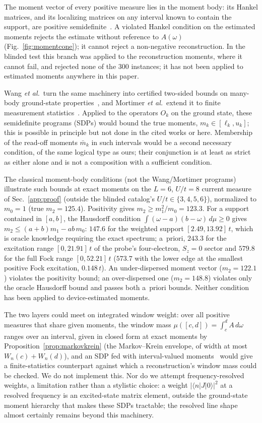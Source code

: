 \documentclass[aps,prb,onecolumn,superscriptaddress,longbibliography,floatfix]{revtex4-2}
\begin{document}
The moment vector of every positive measure lies in the moment body: its Hankel matrices, and its localizing matrices on any interval known to contain the support, are positive semidefinite~\cite{ShohatTamarkin1943,Akhiezer1965}. A violated Hankel condition on the estimated moments rejects the estimate without reference to $A(\omega)$ (Fig.~\ref{fig:momentcone}); it cannot reject a non-negative reconstruction. In the blinded test this branch was applied to the reconstruction moments, where it cannot fail, and rejected none of the $300$ instances; it has not been applied to estimated moments anywhere in this paper.

Wang \emph{et al.}\ turn the same machinery into certified two-sided bounds on many-body ground-state properties~\cite{WangAcin2024}, and Mortimer \emph{et al.}\ extend it to finite measurement statistics~\cite{Mortimer2026}. Applied to the operators $O_k$ on the ground state, these semidefinite programs (SDPs) would bound the true moments, $m_k\in[\ell_k,u_k]$; this is possible in principle but not done in the cited works or here. Membership of the read-off moments $\bar m_k$ in such intervals would be a second necessary condition, of the same logical type as ours; their conjunction is at least as strict as either alone and is not a composition with a sufficient condition.

The classical moment-body conditions (not the Wang/Mortimer programs) illustrate such bounds at exact moments on the $L=6$, $U/t=8$ current measure of Sec.~\ref{app:proof} (outside the blinded catalog's $U/t\in\{3,4,5,6\}$), normalized to $m_0=1$ (true $m_2=125.4$). Positivity gives $m_2\ge m_1^2/m_0=123.3$. For a support contained in $[a,b]$, the Hausdorff condition ${\int(\omega-a)(b-\omega)\,d\mu\ge0}$ gives $m_2\le(a{+}b)m_1-ab\,m_0$: $147.6$ for the weighted support $[2.49,13.92]\,t$, which is oracle knowledge requiring the exact spectrum; a~priori, $243.3$ for the excitation range $[0,21.91]\,t$ of the probe's four-electron, $S_z=0$ sector and $579.8$ for the full Fock range $[0,52.21]\,t$ ($573.7$ with the lower edge at the smallest positive Fock excitation, $0.148\,t$). An under-dispersed moment vector ($m_2=122.1$) violates the positivity bound; an over-dispersed one ($m_2=148.8$) violates only the oracle Hausdorff bound and passes both a~priori bounds. Neither condition has been applied to device-estimated moments.

The two layers could meet on integrated window weight: over all positive measures that share given moments, the window mass $\mu([c,d])=\int_c^d A\,d\omega$ ranges over an interval, given in closed form at exact moments by Proposition~\ref{prop:markovkrein} (the Markov--Krein envelope, of width at most $W_n(c)+W_n(d)$), and an SDP fed with interval-valued moments~\cite{Mortimer2026} would give a finite-statistics counterpart against which a reconstruction's window mass could be checked. We do not implement this. Nor do we attempt frequency-resolved weights, a limitation rather than a stylistic choice: a weight $|\langle n|J|0\rangle|^2$ at a resolved frequency is an excited-state matrix element, outside the ground-state moment hierarchy that makes these SDPs tractable; the resolved line shape almost certainly remains beyond this machinery.
\end{document}
